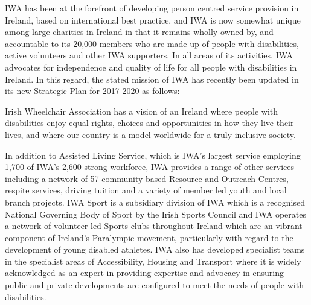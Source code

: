 \documentclass[a4paper,Times New Roman 11pt]{article}
\begin{document}
\begin{samepage}
IWA has been at the forefront of developing person centred  service provision in Ireland, based on international best practice, and IWA is now somewhat unique among large charities in Ireland in that it remains wholly owned by, and accountable to its 20,000 members who are made up of people with disabilities, active volunteers and other IWA supporters. In all areas of its activities, IWA advocates for independence and quality of life for all people with disabilities in Ireland. In this regard, the stated mission of IWA has recently been updated in its new Strategic Plan for 2017-2020 as follows:
\begin{displayquote}
Irish Wheelchair Association  has a vision of an Ireland where people with disabilities enjoy equal rights, choices and opportunities in how they live their lives, and where our country is a model worldwide for a truly inclusive society.
\end{displayquote}

In addition to Assisted Living Service, which is IWA's largest service employing 1,700 of IWA's 2,600 strong workforce, IWA provides a range of other services including a network of 57 community based Resource and Outreach Centres, respite services, driving tuition and a variety of member led youth and local branch projects. IWA Sport is a subsidiary division of IWA which is a recognised National Governing Body of Sport by the Irish Sports Council and IWA operates a network of volunteer led Sports clubs throughout Ireland which are an vibrant component of Ireland's Paralympic  movement, particularly with regard to the development of young disabled athletes.
IWA also has developed specialist teams in the specialist areas of Accessibility, Housing and Transport where it is widely acknowledged as an expert in providing expertise and advocacy in ensuring public and private developments are configured to meet the needs of people with disabilities.

\end{samepage}
\end{document}
